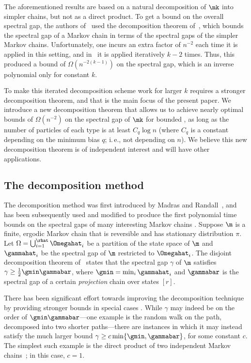 \documentclass[11pt]{article}
\providecommand{\ie}{i.\,e.}
\begin{document}
The aforementioned results are based on a natural decomposition of 
$\mk$ into simpler chains, but not as a direct product. To get a bound 
on the overall spectral gap, the authors of~\cite{MS} used the 
decomposition theorem of~\cite{MR00}, which bounds the spectral gap of 
a Markov chain in terms of the spectral gaps of the simpler Markov 
chains. Unfortunately, one incurs an extra factor of $n^{-2}$ each time 
it is applied in this setting, and in~\cite{MS} it is applied 
iteratively $k-2$ times. Thus, this produced a bound
%
of $\Omega(n^{-2(k-1)})$ on the spectral gap,
which is an inverse polynomial only for constant $k$.

To make this iterated decomposition scheme work for larger $k$ requires 
a stronger decomposition theorem, and that is the main focus of the 
present paper. We introduce a new decomposition theorem that allows us 
to achieve nearly optimal bounds of $\Omega(n^{-2})$ on the spectral 
gap of $\mk$ for bounded \kPs, as long as the number of particles of 
each type is at least $C_q\log n$ (where $C_q$ is a constant depending 
on the minimum bias $q$; \ie,  not depending on $n$).  We believe this 
new decomposition theorem is of independent interest and will have 
other applications.  

\subsection{The decomposition method}

The decomposition method was first introduced by Madras and 
Randall~\cite{madr}, and has been subsequently used and modified to 
produce the first polynomial time bounds on the spectral gaps of many 
interesting Markov chains \cite{CDF00,Dest03,Ding2010, EMT18, 
GHS08,HW16, jstv04,mh15,MR00,mrs,PS17, R01}. Suppose $\m$ is a finite, 
ergodic Markov chain that is reversible and has stationary 
distribution $\pi$. Let
%
$\Omega=\bigcup_{i=1}^{\rhat}\Omegahat_i$  %
be a partition of the state space of $\m$ and $\gammahat_i$ 
be the spectral gap of $\m$ restricted to $\Omegahat_i$. The disjoint 
decomposition theorem of~\cite{MR00} states that the spectral gap 
$\gamma$ of $\m$ satisfies $\gamma \geq \frac{1}{2}\gmin\gammabar$, 
where $\gmin=\min_i \gammahat_i$ and $\gammabar$ is the spectral gap of 
a certain \emph{projection} chain over states $[r]$. 

There has been significant effort towards improving the decomposition 
technique by providing stronger bounds in special 
cases \cite{Dest03,EMT18,GHS08,jstv04,mh15,MR00,PS17,R01}. While 
$\gamma$ may indeed be on the order of $\gmin\gammabar$---one example 
is the random walk on the path, decomposed into two
%
shorter  %
paths---there are instances in which it may instead satisfy the much 
larger bound $\gamma \geq c \min\{\gmin, \gammabar\}$, for some 
constant $c$. The simplest such example is the direct product of two 
independent Markov chains~\cite{bmrs,EMT18}; in this case, $c=1$. 
\end{document}
